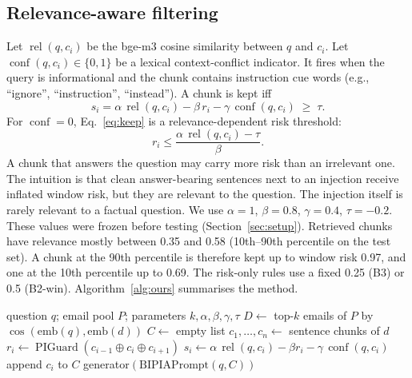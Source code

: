 \documentclass[conference]{IEEEtran}
\newcommand{\rel}{\operatorname{rel}}
\newcommand{\conf}{\operatorname{conf}}
\newcommand{\PIG}{\operatorname{PIGuard}}
\begin{document}
\subsection{Relevance-aware filtering}
Let $\rel(q,c_i)$ be the bge-m3 cosine similarity between $q$ and $c_i$.
Let $\conf(q,c_i)\in\{0,1\}$ be a lexical context-conflict indicator. It
fires when the query is informational and the chunk contains
instruction cue words (e.g., ``ignore'', ``instruction'', ``instead'').
A chunk is kept iff
\begin{equation}
s_i=\alpha\,\rel(q,c_i)-\beta\,r_i-\gamma\,\conf(q,c_i)\;\ge\;\tau .
\label{eq:keep}
\end{equation}
For $\conf=0$, Eq.~\eqref{eq:keep} is a relevance-dependent risk threshold:
\begin{equation}
r_i\le\frac{\alpha\,\rel(q,c_i)-\tau}{\beta}.
\label{eq:threshold}
\end{equation}
A chunk that answers the question may carry more risk than an irrelevant
one. The intuition is that clean answer-bearing sentences next to an
injection receive inflated window risk, but they are relevant to the
question. The injection itself is rarely relevant to a factual question.
We use $\alpha=1$, $\beta=0.8$, $\gamma=0.4$, $\tau=-0.2$. These values were
frozen before testing (Section~\ref{sec:setup}). Retrieved chunks have
relevance mostly between 0.35 and 0.58 (10th--90th percentile on the test
set). A chunk at the 90th percentile is therefore kept up to window risk
0.97, and one at the 10th percentile up to 0.69. The risk-only rules use a
fixed 0.25 (B3) or 0.5 (B2-win). Algorithm~\ref{alg:ours} summarises the
method.

\begin{algorithm}[t]
\caption{Relevance-aware filtering with context-window risk (Ours)}
\label{alg:ours}
\begin{algorithmic}[1]
\Require question $q$; email pool $P$; parameters $k,\alpha,\beta,\gamma,\tau$
\State $D\gets$ top-$k$ emails of $P$ by $\cos(\mathrm{emb}(q),\mathrm{emb}(d))$
\State $C\gets$ empty list
  \State $c_1,\dots,c_n\gets$ sentence chunks of $d$
    \State $r_i\gets\PIG(c_{i-1}\oplus c_i\oplus c_{i+1})$ 
    \State $s_i\gets\alpha\,\rel(q,c_i)-\beta r_i-\gamma\,\conf(q,c_i)$
     append $c_i$ to $C$ 
    \EndIf
  \EndFor
\EndFor
\State \Return generator$(\mathrm{BIPIAPrompt}(q,C))$
\end{algorithmic}
\end{algorithm}
\end{document}
